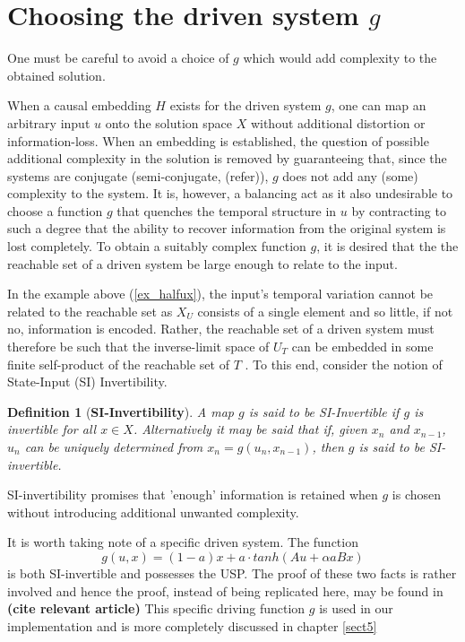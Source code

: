 \documentclass[a4paper,12pt,twoside]{book}
\newtheorem{Definition}{Definition}[]
\begin{document}

\section {Choosing the driven system $g$}

One must be careful to avoid a choice of $g$ which would  add complexity to the obtained solution.  

When a causal embedding $H$ exists for the driven system $g$, one can map an arbitrary input ${u}$ onto the solution space $X$ without additional distortion or information-loss.   
When an embedding is established, the question of possible additional complexity in the solution is removed by guaranteeing that, since the systems are conjugate (semi-conjugate, (refer)), $g$ does not add any (some) complexity to the system.  
It is, however, a balancing act as it also undesirable to choose a function $g$ that quenches the temporal structure in $u$ by contracting to such a degree that the ability to recover information from the original system is lost completely. 
To obtain a suitably complex function $g$, it is desired that the the reachable set of a driven system  be large enough to relate to the input.  
 
In the example above (\ref{ex_halfux}), the input's temporal variation cannot be related to the reachable set as $X_U$ consists of a single element and so little, if not no, information is encoded.  Rather, the reachable set of a driven system must therefore be such that the inverse-limit space of $U_T$ can be embedded in some finite self-product of the reachable set of $T$ . To this end, consider the notion of State-Input (SI) Invertibility.  

\begin{Definition}
  [\bf SI-Invertibility]\label{Dfn_SIinv}
  A map $g$ is said to be SI-Invertible if $g$ is invertible for all $x\in{X}$. Alternatively it may be said that if, given $x_n$ and $x_{n-1}$, $u_n$ can be uniquely determined from $x_n=g(u_n,x_{n-1})$, then $g$ is said to be SI-invertible.
\end{Definition}
 
SI-invertibility promises that 'enough' information is retained when $g$ is chosen without introducing additional unwanted complexity.  

It is worth taking note of a specific driven system. The function 
\begin{equation}  \label{eqn_driving}
g(u,x)=(1-a)x+a{\cdot}tanh(Au+\alpha{a}Bx)
\end{equation} 
is both SI-invertible and possesses the USP. The proof of these two facts is rather involved and  hence the proof, instead of being replicated here, may be found in \textbf{(cite relevant article)}
This specific driving function $g$ is used in our implementation and is more completely discussed in chapter \ref{sect5}
\end{document}
